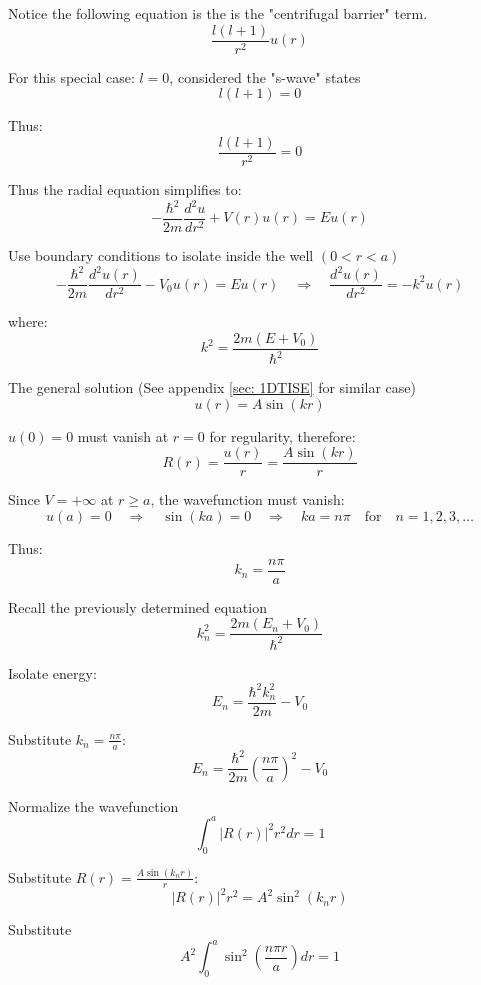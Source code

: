 \documentclass[12pt]{article}
\begin{document}
        Notice the following equation is the is the "centrifugal barrier" term.
        \[
            \frac{l(l+1)}{r^2} u(r)
        \]

        For this special case: \( l=0 \), considered the "s-wave" states
        \[
            l(l+1) = 0
        \]
    
        Thus:
        \[
            \frac{l(l+1)}{r^2} = 0
        \]

        Thus the radial equation simplifies to:
        \[
        -\frac{\hbar^2}{2m} \frac{d^2 u}{dr^2} + V(r) u(r) = E u(r)
        \]

        Use boundary conditions to isolate inside the well \( (0 < r < a) \)
        \[
            -\frac{\hbar^2}{2m} \frac{d^2 u(r)}{dr^2} - V_0 u(r) = E u(r) 
            \quad \Rightarrow \quad 
            \frac{d^2 u(r)}{dr^2} = -k^2 u(r)
        \]

        where:
        \[
            k^2 = \frac{2m (E + V_0)}{\hbar^2}
        \]

        The general solution (See appendix \ref{sec: 1DTISE} for similar case)
        \[
            u(r) = A \sin(kr)
        \]

        \( u(0) = 0 \) must vanish at \( r=0 \) for regularity, therefore:
        \[
            R(r) = \frac{u(r)}{r} = \frac{A \sin(kr)}{r}
        \]

        Since \( V = +\infty \) at \( r \geq a \), the wavefunction must vanish:
        \[
            u(a) = 0 \quad \Rightarrow \quad \sin(ka) = 0 \quad \Rightarrow \quad ka = n\pi \quad \text{for} \quad n=1,2,3,\dots
        \]

        Thus:
        \[
            k_n = \frac{n\pi}{a}
        \]

        Recall the previously determined equation
        \[
            k_n^2 = \frac{2m (E_n + V_0)}{\hbar^2}
        \]

        Isolate energy:
        \[
            E_n = \frac{\hbar^2 k_n^2}{2m} - V_0
        \]

        Substitute \( k_n = \frac{n\pi}{a} \):
        \[
            E_n = \frac{\hbar^2}{2m} \left( \frac{n\pi}{a} \right)^2 - V_0
        \]

        Normalize the wavefunction
        \[
            \int_0^a |R(r)|^2 r^2 dr = 1
        \]

        Substitute $R(r) = \frac{A \sin(k_n r)}{r}$:
        \[
            |R(r)|^2 r^2 = A^2 \sin^2(k_n r)
        \]

        Substitute
        \[
            A^2 \int_0^a \sin^2\left( \frac{n\pi r}{a} \right) dr = 1
        \]
\end{document}
